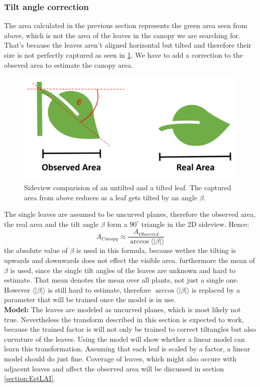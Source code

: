 \subsubsection{Tilt angle correction}
The area calculated in the previous section represents the green area seen from above, which is not the area of the leaves in the canopy we are searching for. That's because the leaves aren't aligned horizontal but tilted and therefore their size is not perfectly captured as seen in \ref{fig:tiltedLeaf}. We have to add a correction to the obseved area to estimate the canopy area.\\
   \begin{figure}[H]
       \centering
       \includegraphics[scale=0.6]{tiltedLeaf.PNG}
       \caption{Sideview comparision of an untilted and a tilted leaf. The captured area from above reduces as a leaf gets tilted by an angle $\beta$.}
       \label{fig:tiltedLeaf}
   \end{figure}
The single leaves are assumed to be uncurved planes, therefore the observed area, the real area and the tilt angle $\beta$ form a $90^{\circ}$ triangle in the 2D sideview. Hence:
$$A_{Canopy} \approx \frac{A_{Observed}}{\arccos \langle |\beta |\rangle }$$
the absolute value of $\beta$ is used in this formula, because wether the tilting is upwards and downwards does not effect the visible area. furthermore the mean of $\beta$ is used, since the single tilt angles of the leaves are unknown and hard to estimate. That mean denotes the mean over all plants, not just a single one. However $\langle |\beta |\rangle$ is still hard to estimate, therefore $\arccos \langle |\beta |\rangle$ is replaced by a parameter that will be trained once the model is in use.\\
\textbf{Model: } The leaves are modeled as uncurved planes, which is most likely not true. Nevertheless the transform described in this section is expected to work, because the trained factor is will not only be trained to correct tiltangles but also curvature of the leaves. Using the model will show whether a linear model can learn this transformation. Assuming that each leaf is scaled by a factor, a linear model should do just fine. Coverage of leaves, which might also occure with adjacent leaves and affect the observed area will be discussed in section \ref{section:EstLAI}.
